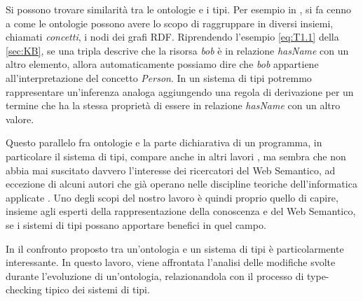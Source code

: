 Si possono trovare similarità tra le ontologie e i tipi. Per esempio in \cite{hitzler2021review}, si fa cenno a come le ontologie possono avere lo scopo di raggruppare in diversi insiemi, chiamati \textit{concetti}, i nodi dei grafi RDF. Riprendendo l'esempio \eqref{eq:T1.1} della \autoref{sec:KB}, se una tripla descrive che la risorsa \textsl{bob} è in relazione \textsl{hasName} con un altro elemento, allora automaticamente possiamo dire che \textsl{bob} appartiene all'interpretazione del concetto \textsl{Person}. In un sistema di tipi potremmo rappresentare  un'inferenza analoga aggiungendo una regola di derivazione per un termine che ha la stessa proprietà di essere in relazione \textsl{hasName} con un altro valore.

Questo parallelo fra ontologie e la parte dichiarativa di un programma, in particolare il sistema di tipi, compare anche in altri lavori \cite{moten2015SWTypeSystem, despeyroux2008evolution}, ma sembra che non abbia mai suscitato davvero l'interesse dei ricercatori del Web Semantico, ad eccezione di alcuni autori che già operano nelle discipline teoriche dell'informatica applicate \cite{dapoigny2011typetheoryKR, leinbergerphdthesis, ciobanu2016typeFoundationforRDFS}. Uno degli scopi del nostro lavoro è quindi proprio quello di capire, insieme agli esperti della rappresentazione della conoscenza e del Web Semantico, se i sistemi di tipi possano apportare benefici in quel campo.

In \cite{despeyroux2008evolution} il confronto proposto tra un'ontologia e un sistema di tipi è particolarmente interessante. In questo lavoro, viene affrontata l'analisi delle modifiche svolte durante l'evoluzione di un'ontologia, relazionandola con il processo di type-checking tipico dei sistemi di tipi.

